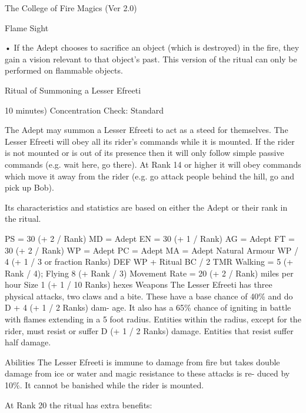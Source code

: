 \begin{Chapter}{The College of Fire Magics (Ver 2.0)}
\begin{ritual}[R-2]{Flame Sight }
\begin{effects}
• If the Adept chooses to sacrifice an object (which 
is destroyed) in the fire, they gain a vision relevant 
to  that  object’s past.  This  version  of  the  ritual  can 
only be performed on flammable objects. 

\end{effects}
\end{ritual}

\begin{ritual}[R-3]{Ritual of Summoning a Lesser Efreeti }

10 minutes) 
Concentration Check: Standard 
\begin{effects}
 The  Adept  may  summon  a  Lesser  Efreeti 
to act as a steed for themselves. The Lesser Efreeti 
will  obey  all  its  rider’s  commands  while  it  is 
mounted. If the rider is not mounted or is out of its 
presence  then  it  will  only  follow  simple  passive 
commands (e.g. wait here, go there). At Rank 14 or 
higher it will obey commands which move it away 
from the rider (e.g. go attack people behind the hill, 
go and pick up Bob). 

Its characteristics and statistics are based on either 
the Adept or their rank in the ritual. 

PS = 30 (+ 2 / Rank)  MD = Adept 
EN = 30 (+ 1 / Rank)  AG = Adept 
FT = 30 (+ 2 / Rank)  WP = Adept 
PC = Adept 
MA = Adept 
Natural Armour WP / 4 (+ 1 / 3 or fraction 
Ranks) 
DEF WP + Ritual BC / 2 
TMR Walking = 5 (+ Rank / 4); Flying 8 (+ Rank / 
3) 
Movement Rate = 20 (+ 2 / Rank) miles per hour 
Size 1 (+ 1 / 10 Ranks) hexes 
Weapons  The  Lesser  Efreeti  has  three  physical 
attacks,  two  claws  and  a  bite.  These  have  a  base 
chance of 40\% and do D + 4 (+ 1 / 2 Ranks) dam-
age.  It  also  has  a  65\%  chance  of  igniting  in  battle 
with  flames  extending  in  a  5  foot  radius.  Entities 
within  the  radius,  except  for  the  rider,  must  resist 
or  suffer  D  (+  1  /  2  Ranks)  damage.  Entities  that 
resist suffer half damage. 

Abilities  The  Lesser  Efreeti  is immune  to  damage 
from  fire  but  takes  double  damage  from  ice  or 
water  and  magic  resistance  to  these  attacks  is  re-
duced  by  10\%.  It  cannot  be  banished  while  the 
rider is mounted. 

At Rank 20 the ritual has extra benefits:  


\end{effects}
\end{ritual}
\end{Chapter}
